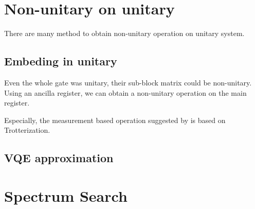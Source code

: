 \section{Non-unitary on unitary}

There are many method to obtain non-unitary
operation on unitary system.
\subsection{Embeding in unitary}

Even the whole gate was unitary,
their sub-block matrix could be non-unitary.
Using an ancilla register, we can obtain a
non-unitary operation on the main register.

Especially, the measurement based 
operation suggested by 
is based on Trotterization.


\subsection{VQE approximation}

\section{Spectrum Search}